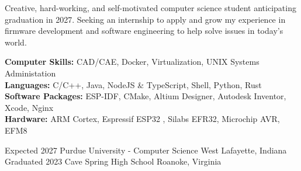 \documentclass[9pt]{developercv} %
\begin{document}
\vspace{0.5cm}



\begin{minipage}[t]{1\textwidth} %
	\vspace{-\baselineskip} %
	Creative, hard-working, and self-motivated computer science student anticipating graduation in 2027. Seeking an internship to apply and grow my experience in firmware development and software engineering to help solve issues in today's world.
\end{minipage}


\begin{minipage}[t]{1\textwidth} %
	\vspace{-\baselineskip} %
	\textbf{Computer Skills:} CAD/CAE, Docker, Virtualization, UNIX Systems Administation\\
	\textbf{Languages:} C/C++, Java, NodeJS \& TypeScript, Shell, Python, Rust\\
	\textbf{Software Packages:} ESP-IDF, CMake, Altium Designer, Autodesk Inventor, Xcode, Nginx\\
	\textbf{Hardware:} ARM Cortex, Espressif ESP32 , Silabs EFR32, Microchip AVR, EFM8
\end{minipage}



\begin{entrylist}
	\entry
		{Expected 2027}
		{Purdue University - Computer Science}
		{West Lafayette, Indiana}
		{\lorem \lorem \lorem}
	\entry
		{Graduated 2023}
		{Cave Spring High School}
		{Roanoke, Virginia}
		{\lorem \lorem \lorem}
\end{entrylist}

\end{document}
